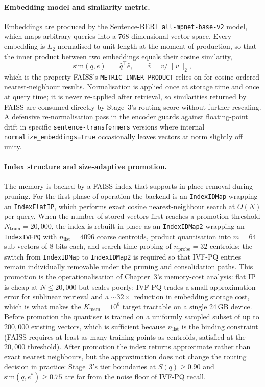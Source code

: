 \paragraph{Embedding model and similarity metric.}
Embeddings are produced by the Sentence-BERT \texttt{all-mpnet-base-v2} model, which maps arbitrary queries into a 768-dimensional vector space. Every embedding is $L_{2}$-normalised to unit length at the moment of production, so that the inner product between two embeddings equals their cosine similarity,
\begin{equation}
\mathrm{sim}(q, e) \;=\; \hat{q}^{\top} \hat{e}, \qquad \hat{v} = v / \|v\|_{2},
\label{eq:cosine}
\end{equation}
which is the property FAISS's \texttt{METRIC\_INNER\_PRODUCT} relies on for cosine-ordered nearest-neighbour results. Normalisation is applied once at storage time and once at query time; it is never re-applied after retrieval, so similarities returned by FAISS are consumed directly by Stage~3's routing score without further rescaling. A defensive re-normalisation pass in the encoder guards against floating-point drift in specific \texttt{sentence-transformers} versions where internal \texttt{normalize\_embeddings=True} occasionally leaves vectors at norm slightly off unity.

\paragraph{Index structure and size-adaptive promotion.}
The memory is backed by a FAISS index that supports in-place removal during pruning. For the first phase of operation the backend is an \texttt{IndexIDMap} wrapping an \texttt{IndexFlatIP}, which performs exact cosine nearest-neighbour search at $O(N)$ per query. When the number of stored vectors first reaches a promotion threshold $N_{\text{train}} = 20{,}000$, the index is rebuilt in place as an \texttt{IndexIDMap2} wrapping an \texttt{IndexIVFPQ} with $n_{\text{list}} = 4096$ coarse centroids, product quantisation into $m = 64$ sub-vectors of $8$ bits each, and search-time probing of $n_{\text{probe}} = 32$ centroids; the switch from \texttt{IndexIDMap} to \texttt{IndexIDMap2} is required so that IVF-PQ entries remain individually removable under the pruning and consolidation paths. This promotion is the operationalisation of Chapter~3's memory-cost analysis: flat IP is cheap at $N \leq 20{,}000$ but scales poorly; IVF-PQ trades a small approximation error for sublinear retrieval and a $\sim 32{\times}$ reduction in embedding storage cost, which is what makes the $K_{\text{mem}} = 10^{6}$ target tractable on a single 24\,GB device. Before promotion the quantiser is trained on a uniformly sampled subset of up to $200{,}000$ existing vectors, which is sufficient because $n_{\text{list}}$ is the binding constraint (FAISS requires at least as many training points as centroids, satisfied at the $20{,}000$ threshold). After promotion the index returns approximate rather than exact nearest neighbours, but the approximation does not change the routing decision in practice: Stage~3's tier boundaries at $S(q) \geq 0.90$ and $\mathrm{sim}(q, e^{*}) \geq 0.75$ are far from the noise floor of IVF-PQ recall.

